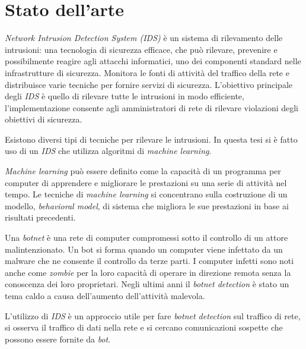 \documentclass[../main.tex]{subfiles}
\begin{document}
\chapter{Stato dell'arte}

\textit{Network Intrusion Detection System (IDS)} è un sistema di rilevamento delle intrusioni: una tecnologia di sicurezza efficace, che può rilevare, prevenire e possibilmente reagire agli attacchi informatici, uno dei componenti standard nelle infrastrutture di sicurezza. Monitora le fonti di attività del traffico della rete e distribuisce varie tecniche per fornire servizi di sicurezza. L'obiettivo principale degli \textit{IDS} è quello di rilevare tutte le intrusioni in modo efficiente, l'implementazione consente agli amministratori di rete di rilevare violazioni degli obiettivi di sicurezza.

Esistono diversi tipi di tecniche per rilevare le intrusioni. In questa tesi si è fatto uso di un \textit{IDS} che utilizza algoritmi di \textit{machine learning}.

\textit{Machine learning} può essere definito come la capacità di un programma per computer di apprendere e migliorare le prestazioni su una serie di attività nel tempo. Le tecniche di \textit{machine learning} si concentrano sulla costruzione di un modello, \textit{behavioral model}, di sistema che migliora le sue prestazioni in base ai risultati precedenti. \newline

Una \textit{botnet} è una rete di computer compromessi sotto il controllo di un attore malintenzionato. Un bot si forma quando un computer viene infettato da un malware che ne consente il controllo da terze parti. I computer infetti sono noti anche come \textit{zombie} per la loro capacità di operare in direzione remota senza la conoscenza dei loro proprietari. Negli ultimi anni il \textit{botnet detection} è stato un tema caldo a causa dell'aumento dell'attività malevola.

L'utilizzo di \textit{IDS} è un approccio utile per fare \textit{botnet detection} sul traffico di rete, si osserva il traffico di dati nella rete e si cercano comunicazioni sospette che possono essere fornite da \textit{bot}. \newline
\end{document}

